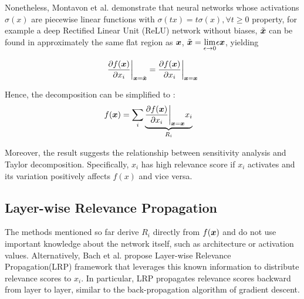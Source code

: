 Nonetheless, Montavon et al.\cite{MontavonMethodsInterpretingUnderstanding2017} demonstrate that  neural networks whose activations $\sigma(x)$ are piecewise linear functions  with $\sigma(tx) = t\sigma(x) ,\forall t \ge 0$ property, for example a deep Rectified Linear Unit (ReLU) network without biases, $\tilde{\patvector{x}}$ can be found in  approximately the same flat region as $\patvector{x}$, $\tilde{\patvector{x}} = \underset{\epsilon \rightarrow 0 }{\lim} \epsilon \patvector{x}$, yielding

 $$\frac{\partial f(\patvector{x})}{\partial x_i}\bigg|_{\patvector{x}={\tilde{\patvector{x}}}} = \frac{\partial f(\patvector{x})}{\partial x_i}\bigg|_{\patvector{x}={\patvector{x}}} $$

Hence, the decomposition can be simplified to :
\begin{align*}
	f(\patvector{x}) &= \sum_{i} \underbrace{\frac{\partial f(\patvector{x})}{\partial x_i}\bigg|_{\patvector{x}={\patvector{x}}}  x_i}_{ R_i } 
\end{align*} 

Moreover, the result suggests the relationship between sensitivity analysis and Taylor decomposition. Specifically, $x_i$ has high relevance score if $x_i$ activates and its variation positively affects $f(x)$ and vice versa.




\subsection{Layer-wise Relevance Propagation}
The methods mentioned so far derive $R_i$ directly from $f(\patvector{x})$ and do not  use important knowledge about the network itself, such as architecture or activation values. Alternatively, Bach et	 al.\citep{BinderLayerwiseRelevancePropagation2016} propose Layer-wise Relevance Propagation(LRP) framework that leverages this known information to distribute relevance scores to $x_i$. In particular, LRP propagates relevance scores backward from layer to layer, similar to the back-propagation algorithm of gradient descent.


